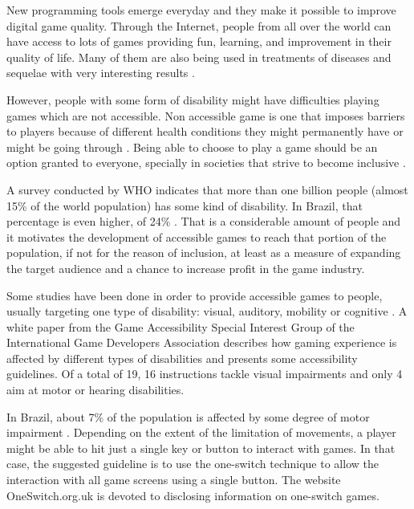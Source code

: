 \documentclass[a4paper]{sbgames}               %
\begin{document}
New programming tools emerge everyday and they make it possible to improve digital game quality. Through the Internet, people from all over the world can have access to lots of games providing fun, learning, and improvement in their quality of life. Many of them are also being used in treatments of diseases and sequelae with very interesting results \cite{kato2010video,baranowski2008playing}.

However, people with some form of disability might have difficulties playing games which are not accessible. Non accessible game is one that imposes barriers to players because of different health conditions they might permanently have or might be going through \cite{yuan2011game,Coutinho2011a}. Being able to choose to play a game should be an option granted to everyone, specially in societies that strive to become inclusive \cite{bierre2004accessibility}.

A survey conducted by WHO  indicates that more than one billion people (almost 15\% of the world population) has some kind of disability. In Brazil, that percentage is even higher, of 24\% \cite{demografico2010caracteristicas}. That is a considerable amount of people and it motivates the development of accessible games to reach that portion of the population, if not for the reason of inclusion, at least as a measure of expanding the target audience and a chance to increase profit in the game industry.

Some studies have been done in order to provide accessible games to people, usually targeting one type of disability: visual, auditory, mobility or cognitive \cite{Coutinho2012,Coutinho2011a,Gerling:2013:KWW:2468356.2479609,Gerling:2012:FMG:2207676.2208324}. A white paper from the Game Accessibility Special Interest Group of the International Game Developers Association  describes how gaming experience is affected by different types of disabilities and presents some accessibility guidelines. Of a total of 19, 16 instructions tackle visual impairments and only 4 aim at motor or hearing disabilities.

In Brazil, about 7\% of the population is affected by some degree of motor impairment \cite{demografico2010caracteristicas}. Depending on the extent of the limitation of movements, a player might be able to hit just a single key or button to interact with games. In that case, the suggested guideline is to use the one-switch technique \cite{IGDA2004} to allow the interaction with all game screens using a single button. The website OneSwitch.org.uk  is devoted to disclosing information on one-switch games.
\end{document}
